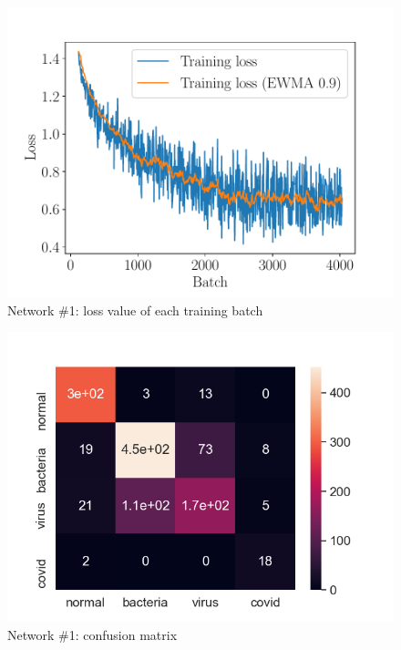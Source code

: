 \documentclass[10pt,a4paper,twocolumn]{article}
\begin{document}
\begin{figure}
    \centering \includegraphics[width=\linewidth]{plot_nn_loss}
    \caption{Network \#1: loss value of each training batch}
\end{figure}

\begin{figure}
    \centering \includegraphics[width=\linewidth]{nn_confusion}
    \caption{Network \#1: confusion matrix}
\end{figure}
\end{document}
